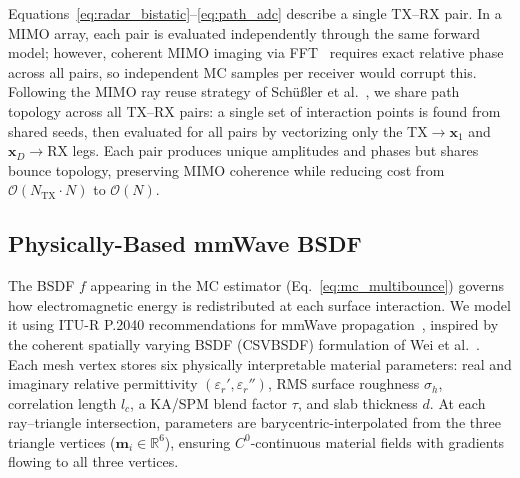 Equations~\eqref{eq:radar_bistatic}--\eqref{eq:path_adc} describe a single TX--RX pair. In a MIMO array, each pair is evaluated independently through the same forward model; however, coherent MIMO imaging via FFT~\cite{9658500} requires exact relative phase across all pairs, so independent MC samples per receiver would corrupt this. Following the MIMO ray reuse strategy of Sch{\"u}{\ss}ler et al.~\cite{9533181}, we share path topology across all TX--RX pairs: a single set of interaction points is found from shared seeds, then evaluated for all pairs by vectorizing only the TX$\rightarrow\mathbf{x}_1$ and $\mathbf{x}_D\rightarrow$RX legs. Each pair produces unique amplitudes and phases but shares bounce topology, preserving MIMO coherence while reducing cost from $\mathcal{O}(N_\mathrm{TX} \cdot N)$ to $\mathcal{O}(N)$.

\subsection{Physically-Based mmWave BSDF}
\label{sec:bsdf}

The BSDF $f$ appearing in the MC estimator (Eq.~\eqref{eq:mc_multibounce}) governs how electromagnetic energy is redistributed at each surface interaction. We model it using ITU-R P.2040 recommendations for mmWave propagation~\cite{itu_p2040}, inspired by the coherent spatially varying BSDF (CSVBSDF) formulation of Wei et al.~\cite{wei2024csvbsdf}. Each mesh vertex stores six physically interpretable material parameters: real and imaginary relative permittivity $(\varepsilon_r', \varepsilon_r'')$, RMS surface roughness $\sigma_h$, correlation length $l_c$, a KA/SPM blend factor $\tau$, and slab thickness $d$. At each ray--triangle intersection, parameters are barycentric-interpolated from the three triangle vertices ($\mathbf{m}_i \in \mathbb{R}^6$), ensuring $C^0$-continuous material fields with gradients flowing to all three vertices.


